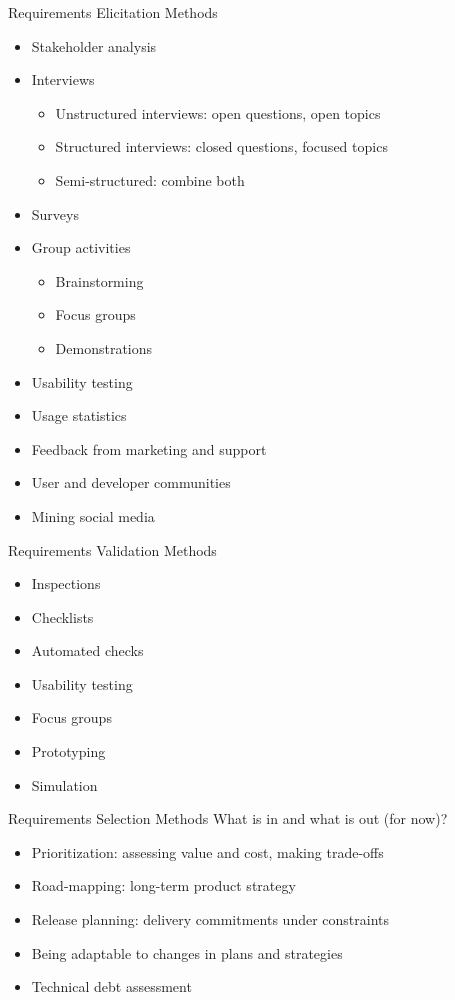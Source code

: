 \documentclass{beamer}
\begin{document}
\begin{frame}[fragile]{Requirements Elicitation Methods}
\begin{itemize}
\item Stakeholder analysis
\item Interviews
\begin{itemize}
  \item Unstructured interviews: open questions, open topics
  \item Structured interviews: closed questions, focused topics
  \item Semi-structured: combine both
\end{itemize}
\item Surveys
\item Group activities
\begin{itemize}
  \item Brainstorming
  \item Focus groups
  \item Demonstrations
\end{itemize}
\item Usability testing
\item Usage statistics
\item Feedback from marketing and support
\item User and developer communities
\item Mining social media
\end{itemize}
\end{frame}

\begin{frame}[fragile]{Requirements Validation Methods}
\begin{itemize}
\item Inspections
\item Checklists
\item Automated checks
\item Usability testing
\item Focus groups
\item Prototyping
\item Simulation
\end{itemize}
\end{frame}

\begin{frame}[fragile]{Requirements Selection Methods}
What is in and what is out (for now)?
\begin{itemize}
\item Prioritization: assessing value and cost, making trade-offs
\item Road-mapping: long-term product strategy 
\item Release planning: delivery commitments under constraints
\item Being adaptable to changes in plans and strategies
\item Technical debt assessment
\end{itemize}
\end{frame}
\end{document}
